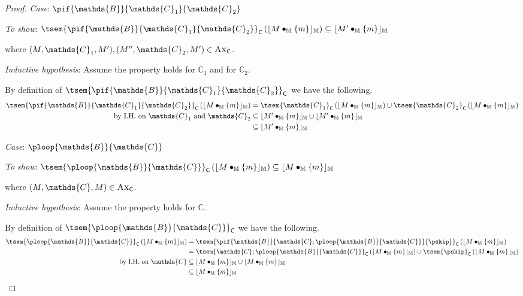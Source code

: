{\begin{proof}
\textit{Case}: $\pif{\mathds{B}}{\mathds{C}_1}{\mathds{C}_2}$

\textit{To show}: $\tsem{\pif{\mathds{B}}{\mathds{C}_1}{\mathds{C}_2}}_\mathsf{C} \left( \lfloor M \bullet_\mathbb{M} \{m\} \rfloor_\mathbb{M} \right) \subseteq \lfloor M' \bullet_\mathbb{M} \{m\} \rfloor_\mathbb{M}$

where $(M, \mathds{C}_1, M'), (M'', \mathds{C}_2, M') \in \textsc{Ax}_\mathsf{C}$.

\textit{Inductive hypothesis}: Assume the property holds for $\mathds{C}_1$ and for $\mathds{C}_2$.

By definition of $\tsem{\pif{\mathds{B}}{\mathds{C}_1}{\mathds{C}_2}}_\mathsf{C}$ we have the following.
\begin{align*}
	\tsem{\pif{\mathds{B}}{\mathds{C}_1}{\mathds{C}_2}}_\mathsf{C} \left( \lfloor M \bullet_\mathbb{M} \{m\} \rfloor_\mathbb{M} \right)
	&=
	\tsem{\mathds{C}_1}_\mathsf{C} \left( \lfloor M \bullet_\mathbb{M} \{m\} \rfloor_\mathbb{M} \right)
	\cup
	\tsem{\mathds{C}_2}_\mathsf{C} \left( \lfloor M \bullet_\mathbb{M} \{m\} \rfloor_\mathbb{M} \right)
	\\
	\text{by I.H. on } \mathds{C}_1 \text{ and } \mathds{C}_2 &\subseteq
	\lfloor M' \bullet_\mathbb{M} \{m\} \rfloor_\mathbb{M}
	\cup
	\lfloor M' \bullet_\mathbb{M} \{m\} \rfloor_\mathbb{M} \\
	&\subseteq
	\lfloor M' \bullet_\mathbb{M} \{m\} \rfloor_\mathbb{M}
\end{align*}

\textit{Case}: $\ploop{\mathds{B}}{\mathds{C}}$

\textit{To show}: $\tsem{\ploop{\mathds{B}}{\mathds{C}}}_\mathsf{C} \left( \lfloor M \bullet_\mathbb{M} \{m\} \rfloor_\mathbb{M} \right) \subseteq \lfloor M \bullet_\mathbb{M} \{m\} \rfloor_\mathbb{M}$

where $(M, \mathds{C}, M) \in \textsc{Ax}_\mathsf{C}$.

\textit{Inductive hypothesis}: Assume the property holds for $\mathds{C}$.

By definition of $\tsem{\ploop{\mathds{B}}{\mathds{C}}}_\mathsf{C}$ we have the following.
\begin{align*}
	\tsem{\ploop{\mathds{B}}{\mathds{C}}}_\mathsf{C} \left( \lfloor M \bullet_\mathbb{M} \{m\} \rfloor_\mathbb{M} \right)
	&=
	\tsem{\pif{\mathds{B}}{\mathds{C};\ploop{\mathds{B}}{\mathds{C}}}{\pskip}}_\mathsf{C} \left( \lfloor M \bullet_\mathbb{M} \{m\} \rfloor_\mathbb{M} \right) \\
	&=
	\tsem{\mathds{C};\ploop{\mathds{B}}{\mathds{C}}}_\mathsf{C} \left( \lfloor M \bullet_\mathbb{M} \{m\} \rfloor_\mathbb{M} \right)
	\cup
	\tsem{\pskip}_\mathsf{C} \left( \lfloor M \bullet_\mathbb{M} \{m\} \rfloor_\mathbb{M} \right) \\
	\text{by I.H. on } \mathds{C} &\subseteq
	\lfloor M \bullet_\mathbb{M} \{m\} \rfloor_\mathbb{M} \cup \lfloor M \bullet_\mathbb{M} \{m\} \rfloor_\mathbb{M} \\
	&\subseteq
	\lfloor M \bullet_\mathbb{M} \{m\} \rfloor_\mathbb{M}
\end{align*}
\end{proof}
}

